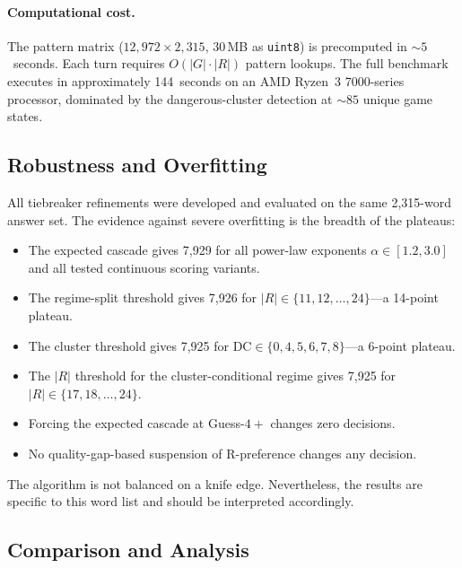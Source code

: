 \documentclass[11pt]{article}
\begin{document}
	\paragraph{Computational cost.}
	The pattern matrix ($12{,}972 \times 2{,}315$, 30\,MB as \texttt{uint8}) is precomputed in ${\sim}5$~seconds.  Each turn requires $O(|G| \cdot |R|)$ pattern lookups.  The full benchmark executes in approximately 144~seconds on an AMD Ryzen~3 7000-series processor, dominated by the dangerous-cluster detection at ${\sim}85$ unique game states.
	
	\subsection{Robustness and Overfitting}
	\label{sec:robustness}
	
	All tiebreaker refinements were developed and evaluated on the same 2,315-word answer set.  The evidence against severe overfitting is the breadth of the plateaus:
	\begin{itemize}[nosep]
		\item The expected cascade gives 7,929 for all power-law exponents $\alpha \in [1.2, 3.0]$ and all tested continuous scoring variants.
		\item The regime-split threshold gives 7,926 for $|R| \in \{11, 12, \ldots, 24\}$---a 14-point plateau.
		\item The cluster threshold gives 7,925 for $\mathrm{DC} \in \{0, 4, 5, 6, 7, 8\}$---a 6-point plateau.
		\item The $|R|$ threshold for the cluster-conditional regime gives 7,925 for $|R| \in \{17, 18, \ldots, 24\}$.
		\item Forcing the expected cascade at Guess-$4{+}$ changes zero decisions.
		\item No quality-gap-based suspension of R-preference changes any decision.
	\end{itemize}
	
	The algorithm is not balanced on a knife edge.  Nevertheless, the results are specific to this word list and should be interpreted accordingly.
	
	\subsection{Comparison and Analysis}
	
\end{document}
